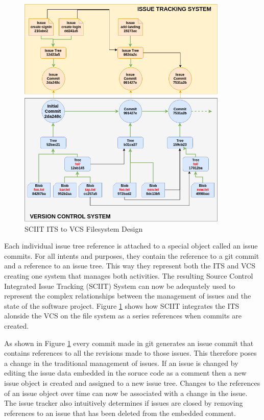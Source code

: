 \documentclass{mproj}
\begin{document}
\begin{figure}[t]
\caption{SCIIT ITS to VCS Filesystem Design}
\label{fig:sciit-filesystem}
\centering
\includegraphics[width=10cm]{sciit-filesystem}
\end{figure}


Each individual issue tree reference is attached to a special object called an issue commits. For all intents and purposes, they contain the reference to a git commit and a reference to an issue tree. This way they represent both the ITS and VCS creating one system that manages both activities. The resulting Source Control Integrated Issue Tracking (SCIIT) System can now be adequately used to represent the complex relationships between the management of issues and the state of the software project. Figure \ref{fig:sciit-filesystem} shows how SCIIT integrates the ITS alonside the VCS on the file system as a series references when commits are created.

As shown in Figure \ref{fig:sciit-filesystem} every commit made in git generates an issue commit that contains references to all the revisions made to those issues. This therefore poses a change in the traditional management of issues. If an issue is changed by editing the issue data embedded in the soruce code as a comment then a new issue object is created and assigned to a new issue tree. Changes to the references of an issue object over time can now be associated with a change in the issue. The issue tracker also intuitively determines if issues are closed by removing references to an issue that has been deleted from the embedded comment.
\end{document}
